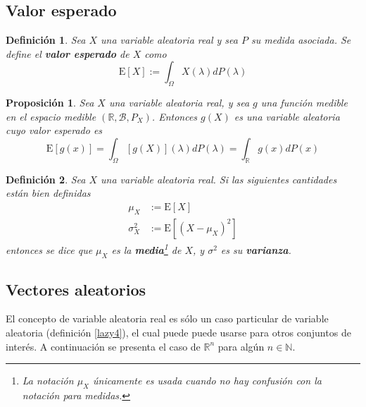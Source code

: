 \documentclass[12pt,letterpaper]{book}
\newtheorem{definicion}{Definición}[chapter]
\newtheorem{proposicion}[teorema]{Proposición}
\newcommand{\R}{\mathbb{R}}
\newcommand{\N}{\mathbb{N}}
\newcommand{\E}[1]{\mathrm{E}\left[ #1 \right]}
\begin{document}
\subsection{Valor esperado}

\begin{definicion}
Sea $X$ una variable aleatoria real y sea $P$ su medida asociada. Se define el \textbf{valor esperado} de $X$ como
\begin{equation}
\E{X} := \int_\Omega X(\lambda) dP(\lambda)
\end{equation}
\end{definicion}

\begin{proposicion}
Sea $X$ una variable aleatoria real, y sea $g$ una función medible en el espacio medible $(\R,\mathcal{B},P_X)$. Entonces $g(X)$ es una variable aleatoria cuyo valor esperado es
\begin{equation}
\E{g(x)} = \int_\Omega [g(X)](\lambda) dP(\lambda) = \int_\R g(x) dP(x)
\end{equation}
\end{proposicion}

\begin{definicion}
Sea $X$ una variable aleatoria real. Si las siguientes cantidades están bien definidas
\begin{align}
\mu_X &{:=} \E{X} \\
\sigma_X^{2} &{:=} \E{(X-\mu_X)^{2}}
\end{align}
entonces se dice que $\mu_X$ es la \textbf{media}\footnote{La notación $\mu_X$ únicamente es usada cuando no hay confusión con la notación para medidas.} de $X$, y $\sigma^2$ es su \textbf{varianza}.
\end{definicion}


\subsection{Vectores aleatorios}

El concepto de variable aleatoria real es sólo un caso particular de variable aleatoria (definición \ref{lazy4}), el cual puede puede usarse para otros conjuntos de interés.
%
A continuación se presenta el caso de $\R^{n}$ para algún $n\in \N$.
\end{document}
